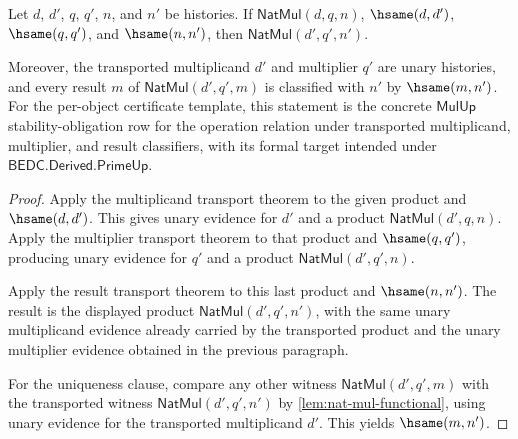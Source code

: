 \begin{theorem}
\label{thm:unary-multiplication-operation-congruence}
Let $d$, $d'$, $q$, $q'$, $n$, and $n'$ be histories. If
$\mathsf{NatMul}(d,q,n)$, $\hsame(d,d')$, $\hsame(q,q')$, and
$\hsame(n,n')$, then $\mathsf{NatMul}(d',q',n')$.

Moreover, the transported multiplicand $d'$ and multiplier $q'$ are unary
histories, and every result $m$ of $\mathsf{NatMul}(d',q',m)$ is classified
with $n'$ by $\hsame(m,n')$. For the per-object certificate template, this
statement is the concrete $\mathsf{MulUp}$ stability-obligation row for the
operation relation under transported multiplicand, multiplier, and result
classifiers, with its formal target intended under
$\mathsf{BEDC.Derived.PrimeUp}$.
\end{theorem}
\begin{proof}
Apply the multiplicand transport theorem to the given product and
$\hsame(d,d')$. This gives unary evidence for $d'$ and a product
$\mathsf{NatMul}(d',q,n)$. Apply the multiplier transport theorem to that
product and $\hsame(q,q')$, producing unary evidence for $q'$ and a product
$\mathsf{NatMul}(d',q',n)$.

Apply the result transport theorem to this last product and $\hsame(n,n')$.
The result is the displayed product $\mathsf{NatMul}(d',q',n')$, with the
same unary multiplicand evidence already carried by the transported product
and the unary multiplier evidence obtained in the previous paragraph.

For the uniqueness clause, compare any other witness
$\mathsf{NatMul}(d',q',m)$ with the transported witness
$\mathsf{NatMul}(d',q',n')$ by \autoref{lem:nat-mul-functional}, using unary
evidence for the transported multiplicand $d'$. This yields $\hsame(m,n')$.
\end{proof}


